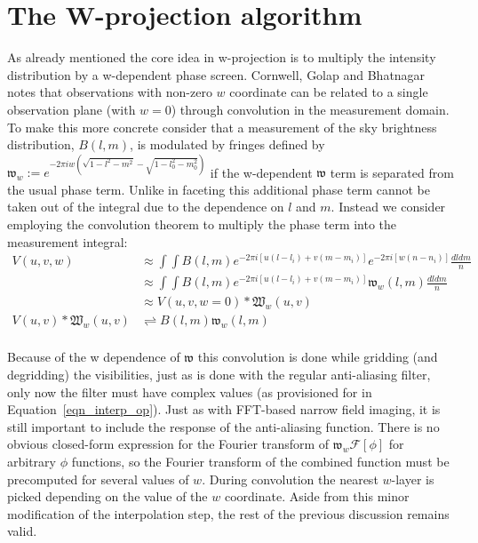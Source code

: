 \section{The W-projection algorithm}
As already mentioned the core idea in w-projection is to multiply the intensity distribution by a w-dependent phase screen. Cornwell, Golap and Bhatnagar \cite{cornwell2008noncoplanar}
notes that observations with non-zero $w$ coordinate can be related to a single observation plane (with $w=0$) through convolution in the measurement domain. To make this
more concrete consider that a measurement of the sky brightness distribution, $B(l,m)$, is modulated by fringes defined by $\mathfrak{w}_w := e^{-2\pi i w(\sqrt{1-l^2-m^2}-\sqrt{1-l_0^2-m_0^2})}$ if the 
w-dependent $\mathfrak{w}$ term is separated from the usual phase term. Unlike in faceting this additional phase term cannot be taken out of the integral due to the dependence on $l$ and $m$. Instead
we consider employing the convolution theorem to multiply the phase term into the measurement integral:
\begin{equation}
 \begin{split}
        V(u,v,w)&\approx\int{\int{B(l,m)e^{-2{\pi}i[u(l-l_i)+v(m-m_i)]}e^{-2{\pi}i[w(n-n_i)]}\frac{dldm}{n}}}\\
		&\approx\int{\int{B(l,m)e^{-2{\pi}i[u(l-l_i)+v(m-m_i)]}\mathfrak{w}_w(l,m)\frac{dldm}{n}}}\\
		&\approx V(u,v,w=0)*\mathfrak{W}_w(u,v)\\
	V(u,v) * \mathfrak{W}_w(u,v) &\rightleftharpoons B(l,m)\mathfrak{w}_w(l,m)\\
 \end{split}
\end{equation}

Because of the w dependence of $\mathfrak{w}$ this convolution is done while gridding (and degridding) the visibilities, just as is done with the regular 
anti-aliasing filter, only now the filter must have complex values (as provisioned for in Equation~\ref{eqn_interp_op}). Just as with FFT-based narrow 
field imaging, it is still important to include the response of the anti-aliasing function. There is no obvious closed-form expression for the 
Fourier transform of $\mathfrak{w}_w\mathcal{F}[\phi]$ for arbitrary $\phi$ functions, so the Fourier transform of the combined function must be precomputed 
for several values of $w$. During convolution the nearest $w$-layer is picked depending on the value of the $w$ coordinate. Aside from this minor modification 
of the interpolation step, the rest of the previous discussion remains valid.

